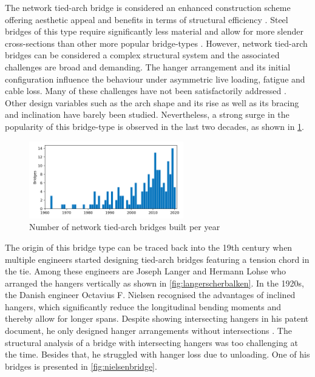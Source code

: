 The network tied-arch bridge is considered an enhanced construction scheme offering aesthetic appeal and benefits in terms of structural efficiency \cite{Hu}. Steel bridges of this type require significantly less material and allow for more slender cross-sections than other more popular bridge-types \cite{Herzog}. However, network tied-arch bridges can be considered a complex structural system and the associated challenges are broad and demanding. 
The hanger arrangement and its initial configuration influence the behaviour under asymmetric live loading, fatigue and cable loss. 
Many of these challenges have not been satisfactorily addressed \cite{Bruno_2}. Other design variables such as the arch shape and its rise as well as its bracing and inclination have barely been studied. Nevertheless, a strong surge in the popularity of this bridge-type is observed in the last two decades, as shown in \cref{fig:yearly_bridges}.

\begin{figure}[H]
    \centering
    \includegraphics[trim={0 2.2cm 0 1.8cm},clip, width=0.60\textwidth]{overleaf/Pictures/myplot.png}
    \caption{Number of network tied-arch bridges built per year \cite{Cavegn}}
    \label{fig:yearly_bridges}
\end{figure}

The origin of this bridge type can be traced back into the 19th century when multiple engineers started designing tied-arch bridges featuring a tension chord in the tie. Among these engineers are Joseph Langer and Hermann Lohse who arranged the hangers vertically as shown in \cref{fig:langerscherbalken}. In the 1920s, the Danish engineer Octavius F. Nielsen recognised the advantages of inclined hangers, which significantly reduce the longitudinal bending moments and thereby allow for longer spans. Despite showing intersecting hangers in his patent document, he only designed hanger arrangements without intersections \cite{Tveit_Bits}. The structural analysis of a bridge with intersecting hangers was too challenging at the time. Besides that, he struggled with hanger loss due to unloading. One of his bridges is presented in \cref{fig:nielsenbridge}.

